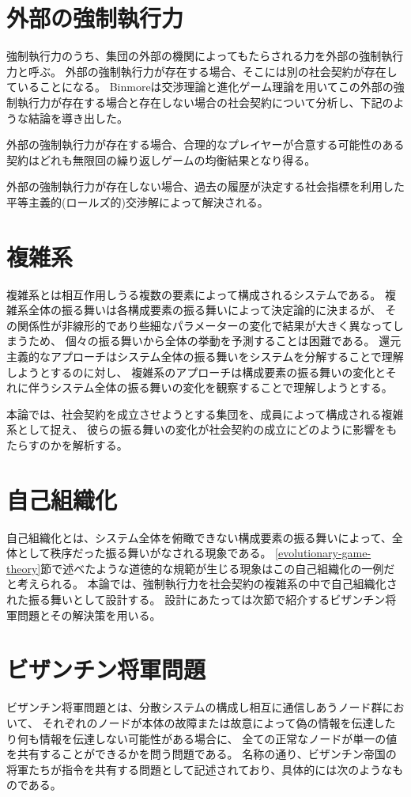 \section{外部の強制執行力}
強制執行力のうち、集団の外部の機関によってもたらされる力を外部の強制執行力と呼ぶ。
外部の強制執行力が存在する場合、そこには別の社会契約が存在していることになる。
Binmoreは交渉理論と進化ゲーム理論を用いてこの外部の強制執行力が存在する場合と存在しない場合の社会契約について分析し、下記のような結論を導き出した。\cite{binmore2005}

\begin{description}
  \item 外部の強制執行力が存在する場合、合理的なプレイヤーが合意する可能性のある契約はどれも無限回の繰り返しゲームの均衡結果となり得る。
  \item 外部の強制執行力が存在しない場合、過去の履歴が決定する社会指標を利用した平等主義的(ロールズ的)交渉解によって解決される。 
\end{description}

\section{複雑系}
複雑系とは相互作用しうる複数の要素によって構成されるシステムである。
複雑系全体の振る舞いは各構成要素の振る舞いによって決定論的に決まるが、
その関係性が非線形的であり些細なパラメーターの変化で結果が大きく異なってしまうため、
個々の振る舞いから全体の挙動を予測することは困難である。
還元主義的なアプローチはシステム全体の振る舞いをシステムを分解することで理解しようとするのに対し、
複雑系のアプローチは構成要素の振る舞いの変化とそれに伴うシステム全体の振る舞いの変化を観察することで理解しようとする。

本論では、社会契約を成立させようとする集団を、成員によって構成される複雑系として捉え、
彼らの振る舞いの変化が社会契約の成立にどのように影響をもたらすのかを解析する。

\section{自己組織化}
自己組織化とは、システム全体を俯瞰できない構成要素の振る舞いによって、全体として秩序だった振る舞いがなされる現象である。
\ref{evolutionary-game-theory}節で述べたような道徳的な規範が生じる現象はこの自己組織化の一例だと考えられる。
本論では、強制執行力を社会契約の複雑系の中で自己組織化された振る舞いとして設計する。
設計にあたっては次節で紹介するビザンチン将軍問題とその解決策を用いる。

\section{ビザンチン将軍問題}
ビザンチン将軍問題とは、分散システムの構成し相互に通信しあうノード群において、
それぞれのノードが本体の故障または故意によって偽の情報を伝達したり何も情報を伝達しない可能性がある場合に、
全ての正常なノードが単一の値を共有することができるかを問う問題である。\cite{lamport1982}
名称の通り、ビザンチン帝国の将軍たちが指令を共有する問題として記述されており、具体的には次のようなものである。

